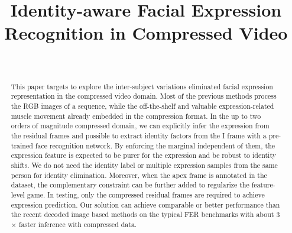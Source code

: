 \documentclass[a4paper,conference]{IEEEtran}
\begin{document}
 
 
 
\title{Identity-aware Facial Expression Recognition in Compressed Video}

\author{\\
}



\maketitle



\begin{abstract}
This paper targets to explore the inter-subject variations eliminated facial expression representation in the compressed video domain. Most of the previous methods process the RGB images of a sequence, while the off-the-shelf and valuable expression-related muscle movement already embedded in the compression format. In the up to two orders of magnitude compressed domain, we can explicitly infer the expression from the residual frames and possible to extract identity factors from the I frame with a pre-trained face recognition network. By enforcing the marginal independent of them, the expression feature is expected to be purer for the expression and be robust to identity shifts. We do not need the identity label or multiple expression samples from the same person for identity elimination. Moreover, when the apex frame is annotated in the dataset, the complementary constraint can be further added to regularize the feature-level game. In testing, only the compressed residual frames are required to achieve expression prediction. Our solution can achieve comparable or better performance than the recent decoded image based methods on the typical FER benchmarks with about 3$\times$ faster inference with compressed data.
\end{abstract}
\end{document}
